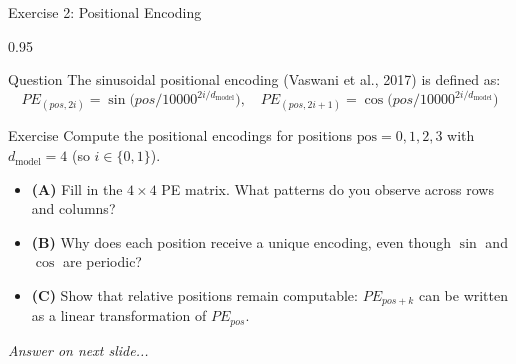 \documentclass[9pt, aspectratio=169, t]{beamer}
\begin{document}
\begin{frame}{Exercise 2: Positional Encoding}
    \begin{cminipage}{0.95\textwidth}
    \begin{alertblock}{Question}
        The sinusoidal positional encoding (Vaswani et al., 2017) is defined as:
        \[
            PE_{(pos,2i)} = \sin\!\bigl(pos / 10000^{2i/d_{\text{model}}}\bigr), \quad
            PE_{(pos,2i+1)} = \cos\!\bigl(pos / 10000^{2i/d_{\text{model}}}\bigr)
        \]
    \end{alertblock}

    \vspace{0.15cm}

    \begin{block}{Exercise}
        Compute the positional encodings for positions $\text{pos} = 0, 1, 2, 3$ with $d_{\text{model}} = 4$ (so $i \in \{0, 1\}$).
        \begin{itemize}\setlength{\itemsep}{3pt}
            \item \textcolor{MainBlue}{\textbf{(A)}} Fill in the $4 \times 4$ PE matrix. What patterns do you observe across rows and columns?
            \item \textcolor{MainBlue}{\textbf{(B)}} Why does each position receive a unique encoding, even though $\sin$ and $\cos$ are periodic?
            \item \textcolor{MainBlue}{\textbf{(C)}} Show that relative positions remain computable: $PE_{pos+k}$ can be written as a linear transformation of $PE_{pos}$.
        \end{itemize}
    \end{block}

    \vspace{0.15cm}

    \begin{center}
        \textit{Answer on next slide...}
    \end{center}
    \end{cminipage}
\end{frame}
\end{document}
